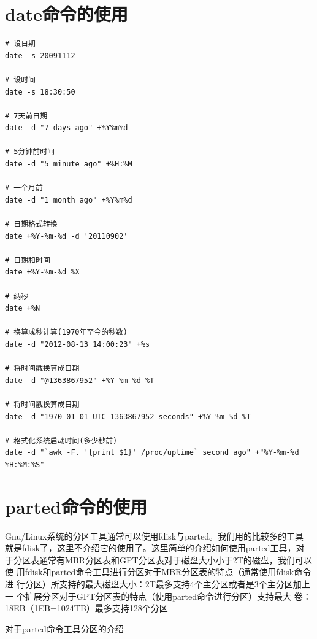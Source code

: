 \section{date命令的使用}
\label{sec:dateCmd}


\small{
\begin{verbatim}
# 设日期
date -s 20091112                     

# 设时间
date -s 18:30:50                     

# 7天前日期
date -d "7 days ago" +%Y%m%d         

# 5分钟前时间
date -d "5 minute ago" +%H:%M        

# 一个月前
date -d "1 month ago" +%Y%m%d        

# 日期格式转换
date +%Y-%m-%d -d '20110902'         

# 日期和时间
date +%Y-%m-%d_%X                    

# 纳秒
date +%N                             

# 换算成秒计算(1970年至今的秒数)
date -d "2012-08-13 14:00:23" +%s    

# 将时间戳换算成日期
date -d "@1363867952" +%Y-%m-%d-%T   

# 将时间戳换算成日期
date -d "1970-01-01 UTC 1363867952 seconds" +%Y-%m-%d-%T  

# 格式化系统启动时间(多少秒前)
date -d "`awk -F. '{print $1}' /proc/uptime` second ago" +"%Y-%m-%d %H:%M:%S"    
\end{verbatim}
}
\normalsize





\section{parted命令的使用}
\label{sec:PartedCmd}

Gnu/Linux系统的分区工具通常可以使用fdisk与parted。我们用的比较多的工具
就是fdisk了，这里不介绍它的使用了。这里简单的介绍如何使用parted工具，对
于分区表通常有MBR分区表和GPT分区表对于磁盘大小小于2T的磁盘，我们可以使
用fdisk和parted命令工具进行分区对于MBR分区表的特点（通常使用fdisk命令进
行分区）所支持的最大磁盘大小：2T最多支持4个主分区或者是3个主分区加上一
个扩展分区对于GPT分区表的特点（使用parted命令进行分区）支持最大
卷：18EB（1EB=1024TB）最多支持128个分区

对于parted命令工具分区的介绍

